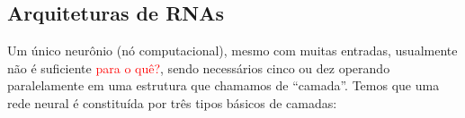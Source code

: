 \documentclass{automatextcc}
\newcommand{\pumi}[1]{\textcolor{red}{#1}}
\begin{document}
\subsection{Arquiteturas de RNAs}


Um único neurônio (nó computacional), mesmo com muitas entradas, usualmente não é suficiente \pumi{para o quê?}, sendo necessários cinco ou dez operando paralelamente em uma estrutura que chamamos de ``camada''. Temos que uma rede neural é constituída por três tipos básicos de camadas:
\end{document}

